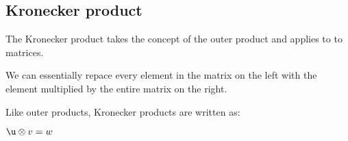 
\subsection{Kronecker product}

The Kronecker product takes the concept of the outer product and applies to to matrices.

We can essentially repace every element in the matrix on the left with the element multiplied by the entire matrix on the right.

Like outer products, Kronecker products are written as:

\(\u\otimes v=w\)

